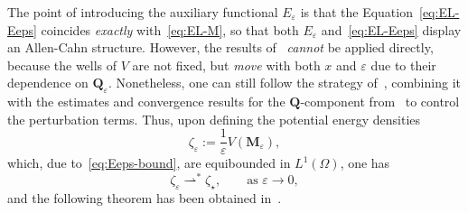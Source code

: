 \documentclass[a4paper, 11pt, twoside, leqno]{article}
\theoremstyle{definition}              %
\theoremstyle{remark}                  %
\newcommand{\Q}{\mathbf{Q}}
\newcommand{\M}{\mathbf{M}}
\newcommand{\eps}{\varepsilon}
\begin{document}
The point of introducing the auxiliary functional $E_\eps$ is that 
the Equation~\eqref{eq:EL-Eeps} coincides \emph{exactly} with~\eqref{eq:EL-M}, 
so that both $E_\eps$ and~\eqref{eq:EL-Eeps} display an Allen-Cahn 
structure. However, the results of~\cite{B} \emph{cannot} be applied directly, 
because the wells of $V$ are not fixed, but \emph{move} with both $x$ and $\eps$ 
due to their dependence on $\Q_\eps$. Nonetheless, one can still follow the strategy 
of~\cite{B}, combining it with the estimates and convergence results for 
the $\Q$-component from~\cite{CDS1} to control the perturbation terms.
Thus, upon defining the potential energy densities
\begin{equation}\label{eq:zeta-eps}
	\zeta_\eps := \frac{1}{\eps} V(\M_\eps), 
\end{equation}
which, due to~\eqref{eq:Eeps-bound}, are equibounded in $L^1(\Omega)$, 
one has 
\begin{equation}\label{eq:zeta*}
	\zeta_\eps \rightharpoonup^* \zeta_\star, \qquad 
	\mbox{as } \eps \to 0, 
\end{equation}
and the following theorem has been obtained in~\cite{CDS2}.
\setcounter{theorem}{-1}
\end{document}
